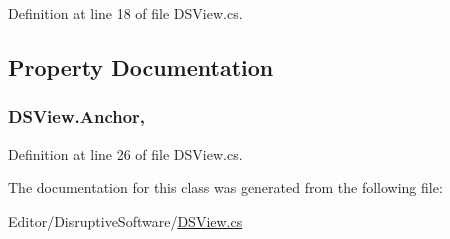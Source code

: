 Definition at line 18 of file D\+S\+View.\+cs.



\subsection{Property Documentation}
\hypertarget{class_d_s_view_a1ab604c5f8e02a913de8a27471a674ed}{
\subsubsection[{Anchor}]{ D\+S\+View.\+Anchor\hspace{0.3cm}{\ttfamily [get]}, {\ttfamily [set]}}}\label{class_d_s_view_a1ab604c5f8e02a913de8a27471a674ed}


Definition at line 26 of file D\+S\+View.\+cs.



The documentation for this class was generated from the following file\+:\begin{DoxyCompactItemize}
\item 
Editor/\+Disruptive\+Software/\hyperlink{_d_s_view_8cs}{D\+S\+View.\+cs}\end{DoxyCompactItemize}
